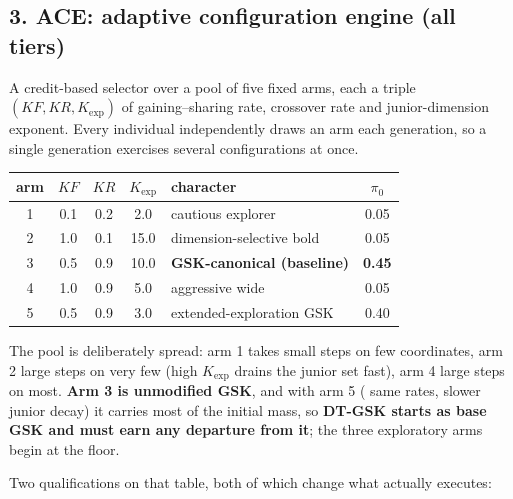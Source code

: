 \documentclass[11pt,a4paper]{article}
\newcommand{\hl}[1]{\textbf{#1}}
\begin{document}
\subsection{3. ACE: adaptive configuration engine (all tiers)}

A credit-based selector over a pool of five fixed arms, each a triple
$(KF, KR, K_{\exp})$ of gaining--sharing rate, crossover rate and
junior-dimension exponent. Every individual independently draws an arm each
generation, so a single generation exercises several configurations at once.

\begin{center}
\small
\begin{tabular}{@{}cccclc@{}}
\toprule
\textbf{arm} & $KF$ & $KR$ & $K_{\exp}$ & \textbf{character} & $\pi_0$\\
\midrule
1 & 0.1 & 0.2 & 2.0  & cautious explorer          & 0.05\\
2 & 1.0 & 0.1 & 15.0 & dimension-selective bold   & 0.05\\
3 & 0.5 & 0.9 & 10.0 & \textbf{GSK-canonical (baseline)} & \textbf{0.45}\\
4 & 1.0 & 0.9 & 5.0  & aggressive wide            & 0.05\\
5 & 0.5 & 0.9 & 3.0  & extended-exploration GSK   & 0.40\\
\bottomrule
\end{tabular}
\end{center}

The pool is deliberately spread: arm 1 takes small steps on few coordinates,
arm 2 large steps on very few (high $K_{\exp}$ drains the junior set fast),
arm 4 large steps on most. \hl{Arm 3 is unmodified GSK}, and with arm 5 (
same rates, slower junior decay) it carries most of the initial mass, so
\hl{DT-GSK starts as base GSK and must earn any departure from it}; the three
exploratory arms begin at the floor.

Two qualifications on that table, both of which change what actually executes:
\end{document}
